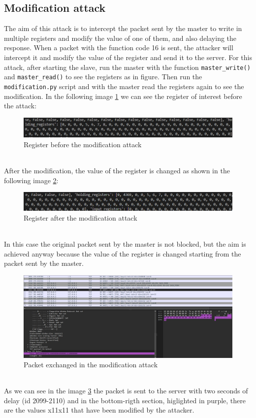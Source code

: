 \documentclass[12pt]{article}
\begin{document}
\subsection{Modification attack}
The aim of this attack is to intercept the packet sent by the master to write in multiple registers 
and modify the value of one of them, and also delaying the response.
When a packet with the function code 16 is sent, the attacker will intercept it and modify 
the value of the register and send it to the server.
For this attack, after starting the slave, run the master with the function \texttt{master\_write()} and \texttt{master\_read()} 
to see the registers as in figure. Then run the \texttt{modification.py} script and with the master 
read the registers again to see the modification.
In the following image \ref{fig:beforeModification} we can see the register of 
interest before the attack:
\begin{figure}[h]
    \centering
    \includegraphics[width=1\textwidth]{images/BeforeModification.png}
    \caption{Register before the modification attack}
    \label{fig:beforeModification}
\end{figure} \\
After the modification, the value of the register is changed as shown in the 
following image \ref{fig:afterModification}:
\begin{figure}[h]
    \centering
    \includegraphics[width=1\textwidth]{images/AfterModification.png}
    \caption{Register after the modification attack}
    \label{fig:afterModification}
\end{figure} \\
In this case the original packet sent by the master is not blocked, but the aim is achieved anyway 
because the value of the register is changed starting from the packet sent by the master.
\begin{figure}[h]
    \centering
    \includegraphics[width=1\textwidth]{images/wiresharkModification.jpg}
    \caption{Packet exchanged in the modification attack}
    \label{fig:wiresharkModification}
\end{figure} \\
As we can see in the image \ref{fig:wiresharkModification} the packet is sent 
to the server with two seconds of delay (id 2099-2110) 
and in the bottom-rigth section, higlighted in purple,
there are the values x11x11 that have been modified by the attacker.
\end{document}
